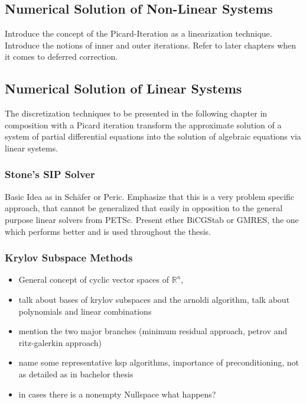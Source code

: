     \subsection{Numerical Solution of Non-Linear Systems}

      Introduce the concept of the Picard-Iteration as a linearization technique. Introduce the notions of inner and outer iterations. Refer to later chapters when it comes to deferred correction.

    \subsection{Numerical Solution of Linear Systems}

        The discretization techniques to be presented in the following chapter in composition with a Picard iteration transform the approximate solution of a system of partial differential equations into the solution of algebraic equations via linear systems.

       \subsubsection{Stone's SIP Solver}

         Basic Idea as in Schäfer or Peric. Emphasize that this is a very problem specific approach, that cannot be generalized that easily in opposition to the general purpose linear solvers from PETSc. Present ether BiCGStab or GMRES, the one which performs better and is used throughout the thesis.

       \subsubsection{Krylov Subspace Methods}
        \begin{itemize}
          \item General concept of cyclic vector spaces of \(\mathbb{R}^n\), 
          \item talk about bases of krylov subspaces and the arnoldi algorithm, talk about polynomials and linear combinations
          \item mention the two major branches (minimum residual approach, petrov and ritz-galerkin approach) 
          \item name some representative ksp algorithms, importance of preconditioning, not as detailed as in bachelor thesis
          \item in cases there is a nonempty Nullspace what happens?
        \end{itemize}

